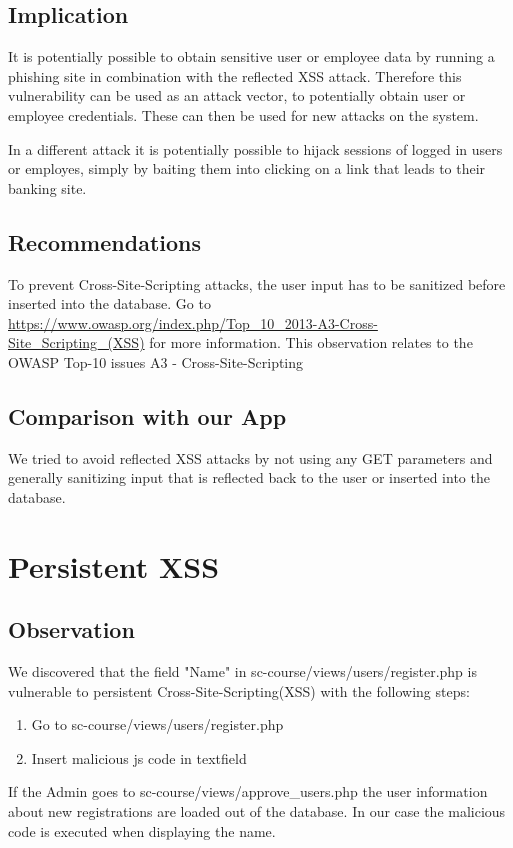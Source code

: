 \subsection{Implication}
It is potentially possible to obtain sensitive user or employee data by running a phishing site in combination with the reflected XSS attack. Therefore this vulnerability can be used as an attack vector, to potentially obtain user or employee credentials. These can then be used for new attacks on the system.

In a different attack it is potentially possible to hijack sessions of logged in users or employes, simply by baiting them into clicking on a link that leads to their banking site. 

\subsection{Recommendations}
To prevent Cross-Site-Scripting attacks, the user input has to be sanitized before inserted into the database. Go to \url{https://www.owasp.org/index.php/Top_10_2013-A3-Cross-Site_Scripting_(XSS)} for more information. \newline
This observation relates to the OWASP Top-10 issues A3 - Cross-Site-Scripting

\subsection{Comparison with our App}
We tried to avoid reflected XSS attacks by not using any GET parameters and generally sanitizing input that is reflected back to the user or inserted into the database.

\section{Persistent XSS}
\label{chapter:persistent_xss}

\subsection{Observation}

We discovered that the field "Name" in sc-course/views/users/register.php is vulnerable to persistent Cross-Site-Scripting(XSS) with the following steps:
\begin{enumerate}
 \item Go to sc-course/views/users/register.php
 \item Insert malicious js code in textfield
\end{enumerate}
 If the Admin goes to sc-course/views/approve\_users.php the user information about new registrations are  loaded out of the database. In our case the malicious code is executed when displaying the name.

